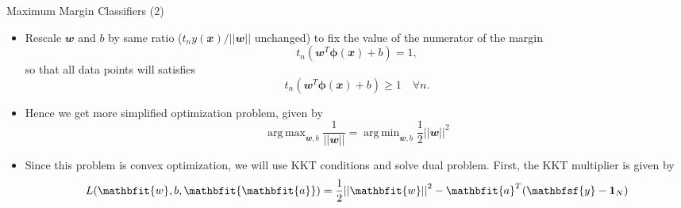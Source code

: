 \documentclass{bredelebeamer}
\DeclareMathOperator*{\argmax}{arg\,max}
\DeclareMathOperator*{\argmin}{arg\,min}
\begin{document}
\begin{frame}{Maximum Margin Classifiers (2)}
  \begin{itemize}
    \item Rescale $\mathbfit{w}$ and $b$ by same ratio ($t_n y(\mathbfit{x}) /
    ||\mathbfit{w}||$ unchanged) to fix the value of the numerator of the margin
    \begin{equation}
      t_n (\mathbfit{w}^T \boldsymbol{\phi} (\mathbfit{x}) + b) = 1,
    \end{equation}
    so that all data points will satisfies 
    \begin{equation}
      t_n (\mathbfit{w}^T \boldsymbol{\phi} (\mathbfit{x}) + b) \geq 1 \quad \forall n.
    \end{equation}

    \item Hence we get more simplified optimization problem, given by
    \begin{equation}
      \argmax_{\mathbfit{w}, b} \frac{1}{||\mathbfit{w}||}
       = \argmin_{\mathbfit{w}, b} \frac{1}{2} {||\mathbfit{w}||}^2
    \end{equation}

    \item Since this problem is convex optimization, we will use KKT conditions
          and solve dual problem. First, the KKT multiplier is given by
    \begin{equation}
      L(\mathbfit{w}, b, \mathbfit{\mathbfit{a}})
      = \frac{1}{2} {||\mathbfit{w}||}^2 - \mathbfit{a}^T (\mathbfsf{y} - \mathbf{1}_N)
    \end{equation}

  \end{itemize}
\end{frame}
\end{document}
